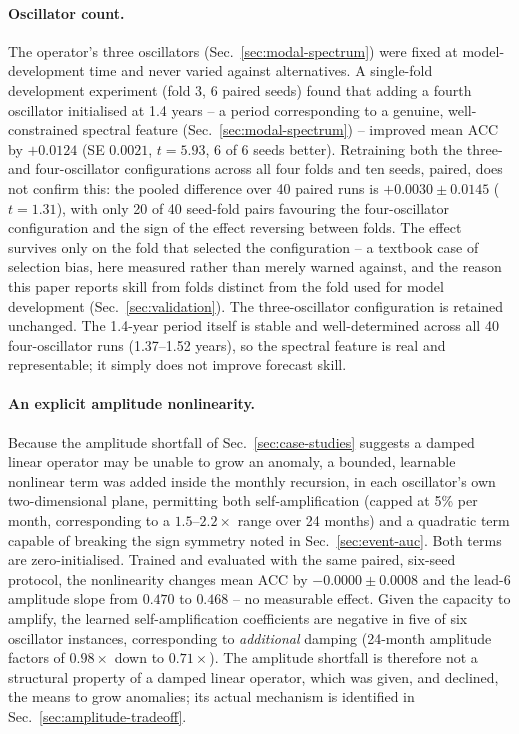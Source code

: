 \paragraph{Oscillator count.} The operator's three oscillators (Sec.~\ref{sec:modal-spectrum})
were fixed at model-development time and never varied against alternatives. A single-fold
development experiment (fold 3, 6 paired seeds) found that adding a fourth oscillator
initialised at 1.4 years -- a period corresponding to a genuine, well-constrained spectral
feature (Sec.~\ref{sec:modal-spectrum}) -- improved mean ACC by $+0.0124$ (SE $0.0021$,
$t=5.93$, 6 of 6 seeds better). Retraining both the three- and four-oscillator configurations
across all four folds and ten seeds, paired, does not confirm this: the pooled difference over
40 paired runs is $+0.0030\pm0.0145$ ($t=1.31$), with only 20 of 40 seed-fold pairs favouring
the four-oscillator configuration and the sign of the effect reversing between folds. The
effect survives only on the fold that selected the configuration -- a textbook case of
selection bias, here measured rather than merely warned against, and the reason this paper
reports skill from folds distinct from the fold used for model development
(Sec.~\ref{sec:validation}). The three-oscillator configuration is retained unchanged. The
1.4-year period itself is stable and well-determined across all 40 four-oscillator runs
(1.37--1.52 years), so the spectral feature is real and representable; it simply does not
improve forecast skill.

\paragraph{An explicit amplitude nonlinearity.} Because the amplitude shortfall of
Sec.~\ref{sec:case-studies} suggests a damped linear operator may be unable to grow an
anomaly, a bounded, learnable nonlinear term was added inside the monthly recursion, in each
oscillator's own two-dimensional plane, permitting both self-amplification (capped at 5\% per
month, corresponding to a $1.5$--$2.2\times$ range over 24 months) and a quadratic term
capable of breaking the sign symmetry noted in Sec.~\ref{sec:event-auc}. Both terms are
zero-initialised. Trained and evaluated with the same paired, six-seed protocol, the
nonlinearity changes mean ACC by $-0.0000\pm0.0008$ and the lead-6 amplitude slope from
$0.470$ to $0.468$ -- no measurable effect. Given the capacity to amplify, the learned
self-amplification coefficients are negative in five of six oscillator instances, corresponding
to \emph{additional} damping (24-month amplitude factors of $0.98\times$ down to
$0.71\times$). The amplitude shortfall is therefore not a structural property of a damped
linear operator, which was given, and declined, the means to grow anomalies; its actual
mechanism is identified in Sec.~\ref{sec:amplitude-tradeoff}.

